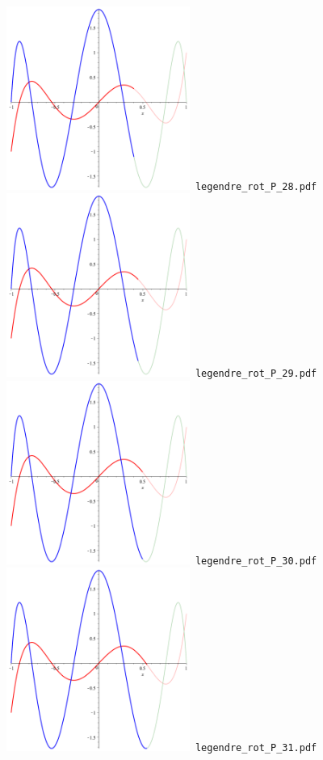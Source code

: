 \documentclass[a4paper]{amsart}
\begin{document}
\includegraphics[width=6cm]{legendre_rot_P_28.pdf}\verb+ legendre_rot_P_28.pdf+\\
\includegraphics[width=6cm]{legendre_rot_P_29.pdf}\verb+ legendre_rot_P_29.pdf+\\
\includegraphics[width=6cm]{legendre_rot_P_30.pdf}\verb+ legendre_rot_P_30.pdf+\\
\includegraphics[width=6cm]{legendre_rot_P_31.pdf}\verb+ legendre_rot_P_31.pdf+\\
\end{document}
